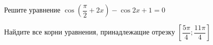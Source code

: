 \begin{ex}
	\begin{condition}
		\begin{enumcols}[label=\asbuk*)]
			\item Решите уравнение \( \cos{\left(\dfrac{\pi}{2}+2x\right)}-\cos 2x + 1=0 \)
			\item Найдите все корни уравнения, принадлежащие отрезку \( \left[\dfrac{5\pi}{4};\dfrac{11\pi}{4}\right] \)
		\end{enumcols}
	\end{condition}
\end{ex}